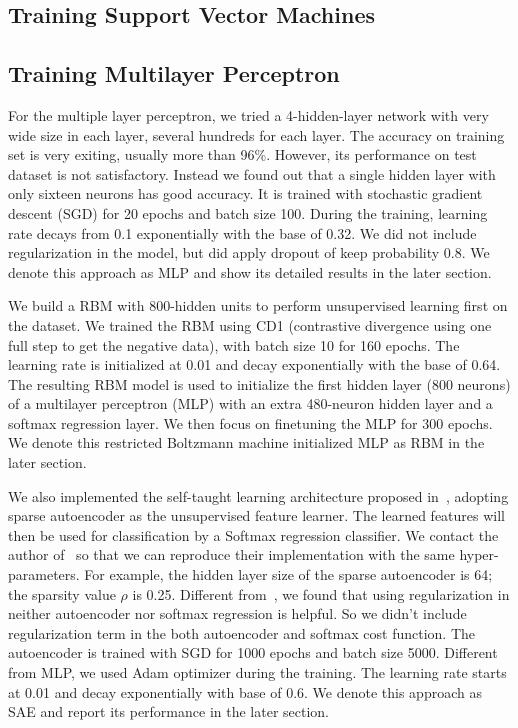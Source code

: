 \subsection{Training Support Vector Machines}

\subsection{Training Multilayer Perceptron}
For the multiple layer perceptron, we tried a 4-hidden-layer network with
very wide size in each layer, several hundreds for each layer.
The accuracy on training set is very exiting, usually more than 96\%.
However, its performance on test dataset is not satisfactory.
Instead we found out that a single hidden layer with only sixteen neurons has good accuracy.
It is trained with stochastic gradient descent (SGD) for 20 epochs and batch size 100.
During the training, learning rate decays from 0.1 exponentially with the base of 0.32.
We did not include regularization in the model, but did apply dropout of keep probability 0.8.
We denote this approach as MLP and show its detailed results in the later section.

We build a RBM with 800-hidden units to perform unsupervised learning first on the dataset.
We trained the RBM using CD1 (contrastive divergence using one full step to get the negative data),
with batch size 10 for 160 epochs.
The learning rate is initialized at 0.01 and decay exponentially with the base of 0.64.
The resulting RBM model is used to initialize the first hidden layer (800 neurons) of a multilayer perceptron (MLP)
with an extra 480-neuron hidden layer and a softmax regression layer.
We then focus on finetuning the MLP for 300 epochs.
We denote this restricted Boltzmann machine initialized MLP as RBM in the later section.

We also implemented the self-taught learning architecture proposed in~\cite{STL-NIDS, SparseAE},
adopting sparse autoencoder as the unsupervised feature learner.
The learned features will then be used for classification by a Softmax regression classifier.
We contact the author of~\cite{STL-NIDS} so that we can reproduce their implementation
with the same hyper-parameters.
For example, the hidden layer size of the sparse autoencoder is 64;
the sparsity value $\rho$ is 0.25.
Different from~\cite{STL-NIDS}, we found that using regularization in
neither autoencoder nor softmax regression is helpful.
So we didn't include regularization term in the both autoencoder and softmax cost function.
The autoencoder is trained with SGD for 1000 epochs and batch size 5000.
Different from MLP, we used Adam optimizer during the training.
The learning rate starts at 0.01 and decay exponentially with base of 0.6.
We denote this approach as SAE and report its performance in the later section.

